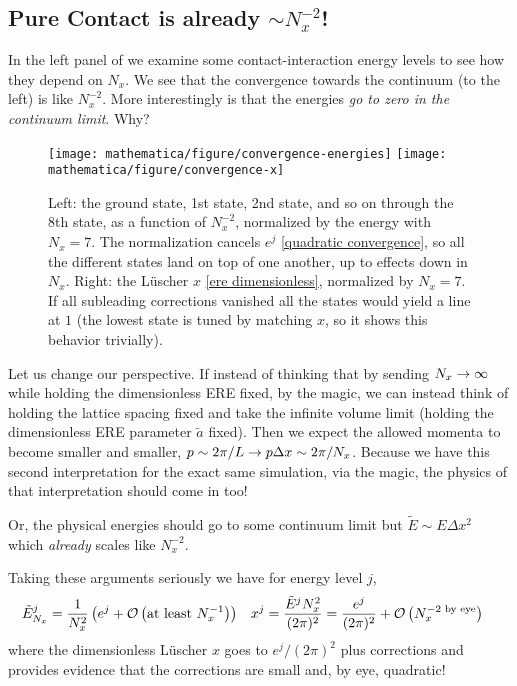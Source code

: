 \subsection{Pure Contact is already $\sim N_x^{-2}$!}
\label{sec:automatic improvement}

In the left panel of  we examine some contact-interaction energy levels to see how they depend on $N_x$.
We see that the convergence towards the continuum (to the left) is like $N_x^{-2}$.
More interestingly is that the energies \emph{go to zero in the continuum limit}.
Why?

\begin{figure}
	\texttt{[image: mathematica/figure/convergence-energies]}
	\texttt{[image: mathematica/figure/convergence-x]}
	\caption{
		Left: the ground state, 1st state, 2nd state, and so on through the 8th state, as a function of $N_x^{-2}$, normalized by the energy with $N_x=7$.
		The normalization cancels $e^j$ \eqref{quadratic convergence}, so all the different states land on top of one another, up to effects down in $N_x$.
		Right: the L\"{u}scher $x$ \eqref{ere dimensionless}, normalized by $N_x=7$.
		If all subleading corrections vanished all the states would yield a line at $1$ (the lowest state is tuned by matching $x$, so it shows this behavior trivially).
	}
	\label{fig:convergence energies}
\end{figure}

Let us change our perspective.
If instead of thinking that by sending $N_x\rightarrow\infty$ while holding the dimensionless ERE fixed, by the magic, we can instead think of holding the lattice spacing fixed and take the infinite volume limit (holding the dimensionless ERE parameter $\tilde{a}$ fixed).
Then we expect the allowed momenta to become smaller and smaller, $p \sim 2\pi/L \rightarrow p\Delta x \sim  2\pi / N_x $.
Because we have this second interpretation for the exact same simulation, via the magic, the physics of that interpretation should come in too!

Or, the physical energies should go to some continuum limit but $\tilde{E} \sim E \Delta x^2$ which \emph{already} scales like $N_x^{-2}$.

Taking these arguments seriously we have for energy level $j$,
\begin{align}
	\tilde{E}^j_{N_x} &= \frac{1}{N_x^2} \left(e^j + \mathcal{O}\left(\text{at least } N_x^{-1}\right) \right)
	&
	x^j = \frac{\tilde{E}^j N_x^2}{(2\pi)^2} &= \frac{e^j}{(2\pi)^2} + \mathcal{O}\left(N_x^{-2\text{ by eye}}\right)
	\label{eq:quadratic convergence}
\end{align}
where the dimensionless L\"{u}scher $x$ goes to $e^j/(2\pi)^2$ plus corrections and  provides evidence that the corrections are small and, by eye, quadratic!


